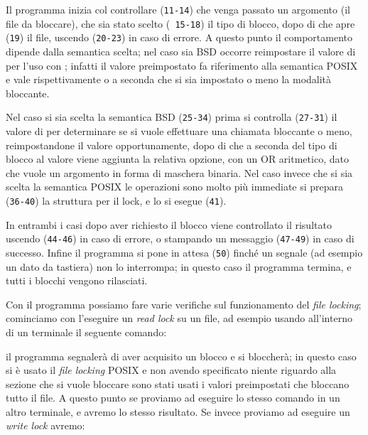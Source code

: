 Il programma inizia col controllare (\texttt{\small 11-14}) che venga passato
un argomento (il file da bloccare), che sia stato scelto (\texttt{\small
  15-18}) il tipo di blocco, dopo di che apre (\texttt{\small 19}) il file,
uscendo (\texttt{\small 20-23}) in caso di errore. A questo punto il
comportamento dipende dalla semantica scelta; nel caso sia BSD occorre
reimpostare il valore di  per l'uso con ; infatti il
valore preimpostato fa riferimento alla semantica POSIX e vale rispettivamente
 o  a seconda che si sia impostato o meno la
modalità bloccante.

Nel caso si sia scelta la semantica BSD (\texttt{\small 25-34}) prima si
controlla (\texttt{\small 27-31}) il valore di  per determinare se
si vuole effettuare una chiamata bloccante o meno, reimpostandone il valore
opportunamente, dopo di che a seconda del tipo di blocco al valore viene
aggiunta la relativa opzione, con un OR aritmetico, dato che 
vuole un argomento  in forma di maschera binaria.  Nel caso
invece che si sia scelta la semantica POSIX le operazioni sono molto più
immediate si prepara (\texttt{\small 36-40}) la struttura per il lock, e lo
si esegue (\texttt{\small 41}).

In entrambi i casi dopo aver richiesto il blocco viene controllato il
risultato uscendo (\texttt{\small 44-46}) in caso di errore, o stampando un
messaggio (\texttt{\small 47-49}) in caso di successo. Infine il programma si
pone in attesa (\texttt{\small 50}) finché un segnale (ad esempio un 
dato da tastiera) non lo interrompa; in questo caso il programma termina, e
tutti i blocchi vengono rilasciati.

Con il programma possiamo fare varie verifiche sul funzionamento del
\textit{file locking}; cominciamo con l'eseguire un \textit{read lock} su un
file, ad esempio usando all'interno di un terminale il seguente comando:

il programma segnalerà di aver acquisito un blocco e si bloccherà; in questo
caso si è usato il \textit{file locking} POSIX e non avendo specificato niente
riguardo alla sezione che si vuole bloccare sono stati usati i valori
preimpostati che bloccano tutto il file. A questo punto se proviamo ad
eseguire lo stesso comando in un altro terminale, e avremo lo stesso
risultato. Se invece proviamo ad eseguire un \textit{write lock} avremo:

